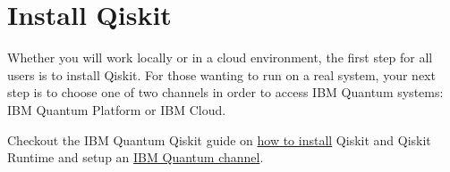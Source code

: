 \documentclass[12pt, oneside]{book}
\theoremstyle{definition}
\theoremstyle{definition}
\theoremstyle{remark}
\begin{document}
\section{Install Qiskit}
Whether you will work locally or in a cloud environment, the first step for all users is to install Qiskit. For those wanting to run on a real system, your next step is to choose one of two channels in order to access IBM Quantum systems: IBM Quantum Platform or IBM Cloud.

Checkout the IBM Quantum Qiskit guide on \href{https://docs.quantum.ibm.com/guides/install-qiskit}{how to install} Qiskit and Qiskit Runtime and setup an \href{https://docs.quantum.ibm.com/guides/setup-channel}{IBM Quantum channel}.





\backmatter  %
    
    
\end{document}
